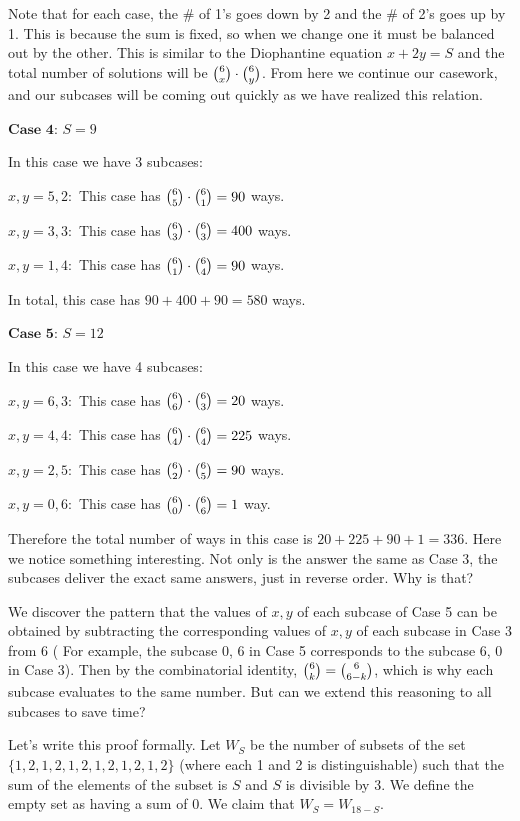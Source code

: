 \begin{enumerate}
 Note that for each case, the \# of 1’s goes down by 2 and the \# of 2’s goes up by 1. This is because the sum is fixed, so when we change one it must be balanced out by the other. This is similar to the Diophantine equation $x + 2y= S$ and the total number of solutions will be $\tbinom{6}{x} \cdot \tbinom{6}{y}$. From here we continue our casework, and our subcases will be coming out quickly as we have realized this relation.

 $\textbf{Case 4: }S=9$

 In this case we have 3 subcases:

 $x, y = 5,2:$ This case has $\tbinom{6}{5} \cdot \tbinom{6}{1} = 90$ ways.

 $x, y = 3,3:$ This case has $\tbinom{6}{3} \cdot \tbinom{6}{3} = 400$ ways.

 $x, y = 1,4:$ This case has $\tbinom{6}{1} \cdot \tbinom{6}{4} = 90$ ways.

 In total, this case has $90+400+90=\boxed{580}$ ways.

 $\textbf{Case 5: } S=12$

 In this case we have 4 subcases:

 $x, y = 6,3:$ This case has $\tbinom{6}{6} \cdot \tbinom{6}{3} = 20$ ways.

 $x, y = 4,4:$ This case has $\tbinom{6}{4} \cdot \tbinom{6}{4} = 225$ ways.

 $x, y = 2,5:$ This case has $\tbinom{6}{2} \cdot \tbinom{6}{5} = 90$ ways.

 $x, y = 0,6:$ This case has $\tbinom{6}{0} \cdot \tbinom{6}{6} = 1$ way.

 Therefore the total number of ways in this case is $20 + 225 + 90 + 1=\boxed{336}$. Here we notice something interesting. Not only is the answer the same as Case 3, the subcases deliver the exact same answers, just in reverse order. Why is that?

 We discover the pattern that the values of $x, y$ of each subcase of Case 5 can be obtained by subtracting the corresponding values of $x, y$ of each subcase in Case 3 from 6 ( For example, the subcase 0, 6 in Case 5 corresponds to the subcase 6, 0 in Case 3). Then by the combinatorial identity, $\tbinom{6}{k} = \tbinom{6}{6-k}$, which is why each subcase evaluates to the same number. But can we extend this reasoning to all subcases to save time?

 Let’s write this proof formally. Let $W_S$ be the number of subsets of the set $\{1,2,1,2,1,2,1,2,1,2,1,2\}$ (where each 1 and 2 is distinguishable) such that the sum of the elements of the subset is $S$ and $S$ is divisible by 3. We define the empty set as having a sum of 0. We claim that $W_S = W_{18-S}$.


\end{enumerate}
